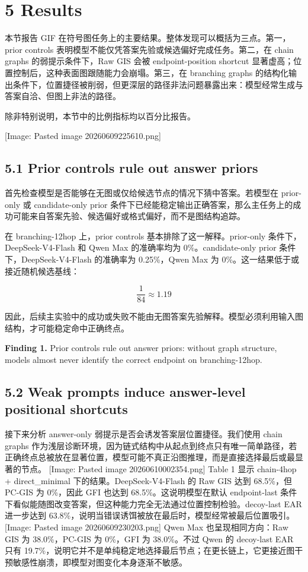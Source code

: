 \documentclass[
  11pt,
]{article}
\begin{document}
\section{5 Results}\label{results}

本节报告 GIF
在符号图任务上的主要结果。整体发现可以概括为三点。第一，prior controls
表明模型不能仅凭答案先验或候选偏好完成任务。第二，在 chain graphs
的弱提示条件下，Raw GIS 会被 endpoint-position shortcut
显著虚高；位置控制后，这种表面图跟随能力会崩塌。第三，在 branching
graphs
的结构化输出条件下，位置捷径被削弱，但更深层的路径非法问题暴露出来：模型经常生成与答案自洽、但图上非法的路径。

除非特别说明，本节中的比例指标均以百分比报告。

{[}Image: Pasted image 20260609225610.png{]}

\subsection{5.1 Prior controls rule out answer
priors}\label{prior-controls-rule-out-answer-priors}

首先检查模型是否能够在无图或仅给候选节点的情况下猜中答案。若模型在
prior-only 或 candidate-only prior
条件下已经能稳定输出正确答案，那么主任务上的成功可能来自答案先验、候选偏好或格式偏好，而不是图结构追踪。

在 branching-12hop 上，prior controls 基本排除了这一解释。prior-only
条件下，DeepSeek-V4-Flash 和 Qwen Max 的准确率均为 0\%。candidate-only
prior 条件下，DeepSeek-V4-Flash 的准确率为 0.25\%，Qwen Max 为
0\%。这一结果低于或接近随机候选基线：

\[
\frac{1}{84}\approx 1.19%
\]

因此，后续主实验中的成功或失败不能由无图答案先验解释。模型必须利用输入图结构，才可能稳定命中正确终点。

\textbf{Finding 1.} Prior controls rule out answer priors: without graph
structure, models almost never identify the correct endpoint on
branching-12hop.

\subsection{5.2 Weak prompts induce answer-level positional
shortcuts}\label{weak-prompts-induce-answer-level-positional-shortcuts}

接下来分析 answer-only 弱提示是否会诱发答案层位置捷径。我们使用 chain
graphs
作为浅层诊断环境，因为链式结构中从起点到终点只有唯一简单路径，若正确终点总被放在显著位置，模型可能不真正沿图推理，而是直接选择最后或最显著的节点。
{[}Image: Pasted image 20260610002354.png{]} Table 1 显示 chain-4hop +
direct\_minimal 下的结果。DeepSeek-V4-Flash 的 Raw GIS 达到 68.5\%，但
PC-GIS 为 0\%，因此 GFI 也达到 68.5\%。这说明模型在默认 endpoint-last
条件下看似能随图改变答案，但这种能力完全无法通过位置控制检验。decoy-last
EAR 进一步达到
63.8\%，说明当错误诱饵被放在最后时，模型经常被最后位置吸引。 {[}Image:
Pasted image 20260609230203.png{]} Qwen Max 也呈现相同方向：Raw GIS 为
38.0\%，PC-GIS 为 0\%，GFI 为 38.0\%。不过 Qwen 的 decoy-last EAR 只有
19.7\%，说明它并不是单纯稳定地选择最后节点；在更长链上，它更接近图干预敏感性崩溃，即模型对图变化本身逐渐不敏感。
\end{document}
